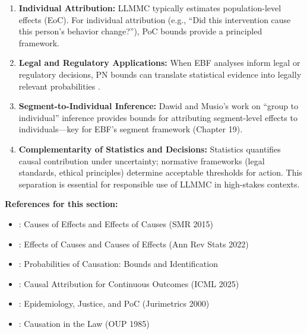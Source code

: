 \begin{enumerate}
\item \textbf{Individual Attribution:}
LLMMC typically estimates population-level effects (EoC). For individual attribution
(e.g., ``Did this intervention cause this person's behavior change?''), PoC bounds
provide a principled framework.

\item \textbf{Legal and Regulatory Applications:}
When EBF analyses inform legal or regulatory decisions, PN bounds can translate
statistical evidence into legally relevant probabilities \citep{greenland2000epidemiology}.

\item \textbf{Segment-to-Individual Inference:}
Dawid and Musio's work on ``group to individual'' inference \citep{dawid2022individual}
provides bounds for attributing segment-level effects to individuals---key for
EBF's segment framework (Chapter 19).

\item \textbf{Complementarity of Statistics and Decisions:}
Statistics quantifies causal contribution under uncertainty; normative frameworks
(legal standards, ethical principles) determine acceptable thresholds for action.
This separation is essential for responsible use of LLMMC in high-stakes contexts.
\end{enumerate}

\textbf{References for this section:}
\begin{itemize}[nosep]
\item \citet{pearl2015causes}: Causes of Effects and Effects of Causes (SMR 2015)
\item \citet{dawid2022effects}: Effects of Causes and Causes of Effects (Ann Rev Stats 2022)
\item \citet{tian2000probabilities}: Probabilities of Causation: Bounds and Identification
\item \citet{luo2025attribution}: Causal Attribution for Continuous Outcomes (ICML 2025)
\item \citet{greenland2000epidemiology}: Epidemiology, Justice, and PoC (Jurimetrics 2000)
\item \citet{hart1985causation}: Causation in the Law (OUP 1985)
\end{itemize}



